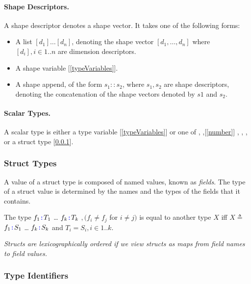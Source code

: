 \documentclass{article}
\begin{document}
\paragraph{Shape Descriptors.}
 A shape descriptor denotes a shape vector. It takes one of the following forms:
 \begin{itemize}
 \item  A list $[d_1] \ldots [d_n]$, denoting the shape vector $[d_1, \ldots, d_n]$ where $[d_i], i \in 1..n$ are dimension descriptors.
 \item A shape variable [\ref{typeVariables}].
 \item A shape append, of the form $s_1 :: s_2$, where $s_1, s_2$ are shape descriptors, denoting the concatenation of the shape vectors denoted by $s1$ and $s_2$. 
 \end{itemize}
 
\paragraph{Scalar Types.}
 A scalar type is either a type variable [\ref{typeVariables}] or one of \BOOL [\ref{bool}],  \NUMBER,[\ref{number}] \INT, \FLOAT, \STRING [\ref{string}], or a struct type [\ref{structTypes}].

\subsubsection{Struct Types}
\label{structTypes}

A value of a struct type is composed of named values, known as {\em fields}. The type of a struct value is determined by the names and the types of the fields that it contains.

\StructType{}

\PropertySig{}

The type \LCURLY{}$f_1 \texttt{\color{blue} :}{} T_1$\COMMA{} \ldots\COMMA{}  $f_k \texttt{\color{blue} :}{} T_k$\RCURLY{} $, (f_i \ne f_j$ for $i \ne j)$ is equal to another type $X$ iff  $X \triangleq $ \LCURLY{}$f_1 \texttt{\color{blue} :}{} S_1$\COMMA{} \ldots\COMMA{}  $f_k \texttt{\color{blue} :}{} S_k$\RCURLY{} and $T_i = S_i, i \in 1..k$.


{\em
Structs are lexicographically ordered if we view structs as maps from field names to field values. 
}

\subsubsection{Type Identifiers}
\label{typeIdentifiers}
\end{document}
